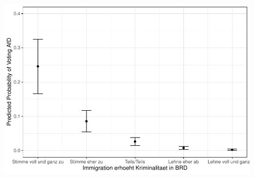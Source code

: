 \documentclass[
]{article}
\begin{document}
\includegraphics{AVCD_Final_Assignment-Edenhofer_files/figure-latex/afd-immig-crime-1.pdf}
\end{document}
